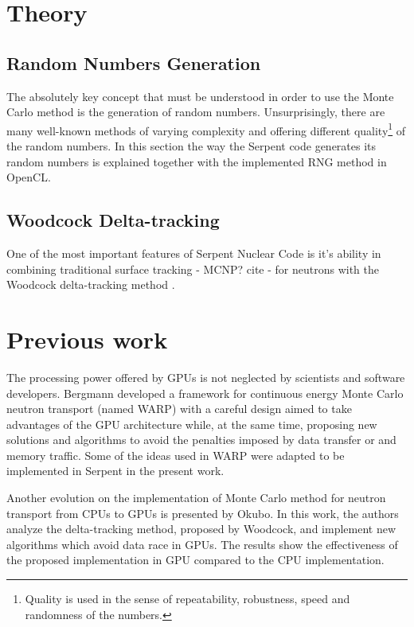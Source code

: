 \documentclass[twoside,a4paper,12pt,english]{anstrans}
\begin{document}
\section{Theory}

\subsection{Random Numbers Generation}
The absolutely key concept that must be understood in order to use the Monte Carlo method is
the generation of random numbers. Unsurprisingly, there are many well-known methods of varying
complexity and offering different quality\footnote{Quality is used in the sense of
  repeatability, robustness, speed and randomness of the numbers.} of the random numbers.
In this section the way the Serpent code generates its random numbers is explained together
with the implemented RNG method in OpenCL.


\subsection{Woodcock Delta-tracking}

One of the most important features of Serpent Nuclear Code is it's ability in combining
traditional surface tracking - MCNP? cite - for neutrons with the Woodcock delta-tracking method \cite{Woodcock1965}.

\section{Previous work}

The processing power offered by GPUs is not neglected by scientists and software developers.
Bergmann\cite{Bergmann2014} developed a framework for continuous energy Monte Carlo neutron
transport (named WARP) with a careful design aimed to take advantages of the GPU architecture while, at the
same time, proposing new solutions and algorithms to avoid the penalties imposed by data transfer
or and memory traffic. Some of the ideas used in WARP were adapted to be implemented in Serpent in
the present work.

Another evolution on the implementation of Monte Carlo method for neutron transport from CPUs to GPUs
is presented by Okubo\cite{Okubo2016}. In this work, the authors analyze the delta-tracking method,
proposed by Woodcock\cite{Woodcock1965}, and implement new algorithms which avoid data race in
GPUs. The results show the effectiveness of the proposed implementation in GPU compared to the CPU
implementation.
\end{document}
